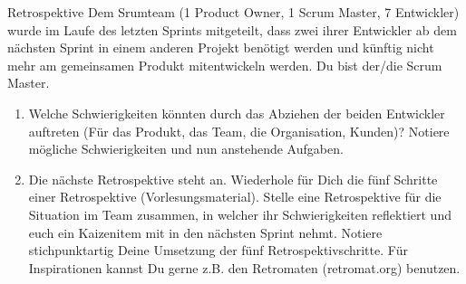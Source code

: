 \documentclass{article}
\author{Leopold Lemmermann}
\begin{document}
\createtitle


\begin{exercise}{Retrospektive}
  Dem Srumteam (1 Product Owner, 1 Scrum Master, 7 Entwickler) wurde im Laufe des letzten Sprints mitgeteilt, dass zwei ihrer Entwickler ab dem nächsten Sprint in einem anderen Projekt benötigt werden und künftig nicht mehr am gemeinsamen Produkt mitentwickeln werden. Du bist der/die Scrum Master.

  \begin{enumerate}
    \item Welche Schwierigkeiten könnten durch das Abziehen der beiden Entwickler auftreten (Für das Produkt, das Team, die Organisation, Kunden)? Notiere mögliche Schwierigkeiten und nun anstehende Aufgaben.
    \item Die nächste Retrospektive steht an. Wiederhole für Dich die fünf Schritte einer Retrospektive (Vorlesungsmaterial). Stelle eine Retrospektive für die Situation im Team zusammen, in welcher ihr Schwierigkeiten reflektiert und euch ein Kaizenitem mit in den nächsten Sprint nehmt. Notiere stichpunktartig Deine Umsetzung der fünf Retrospektivschritte. Für Inspirationen kannst Du gerne z.B. den Retromaten (retromat.org) benutzen.
  \end{enumerate}


\end{exercise}
\end{document}
